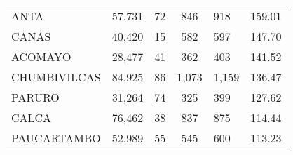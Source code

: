 \begin{tabular}{lrcclr}
	\cellcolor[HTML]{FFFF99}ANTA                                   & 57,731                                                         & 72                                                         & 846                  & 918                                                                 & 159.01                                                                       \\
	\cellcolor[HTML]{FFFF99}CANAS                                  & 40,420                                                         & 15                                                         & 582                  & 597                                                                 & 147.70                                                                       \\
	\cellcolor[HTML]{C6E0B4}ACOMAYO                                & 28,477                                                         & 41                                                         & 362                  & 403                                                                 & 141.52                                                                       \\
	\cellcolor[HTML]{C6E0B4}CHUMBIVILCAS                           & 84,925                                                         & 86                                                         & 1,073                & 1,159                                                               & 136.47                                                                       \\
	\cellcolor[HTML]{C6E0B4}PARURO                                 & 31,264                                                         & 74                                                         & 325                  & 399                                                                 & 127.62                                                                       \\
	\cellcolor[HTML]{C6E0B4}CALCA                                  & 76,462                                                         & 38                                                         & 837                  & 875                                                                 & 114.44                                                                       \\
	\cellcolor[HTML]{C6E0B4}PAUCARTAMBO                            & 52,989                                                         & 55                                                         & 545                  & 600                                                                 & 113.23                                                                       \\

\end{tabular}
